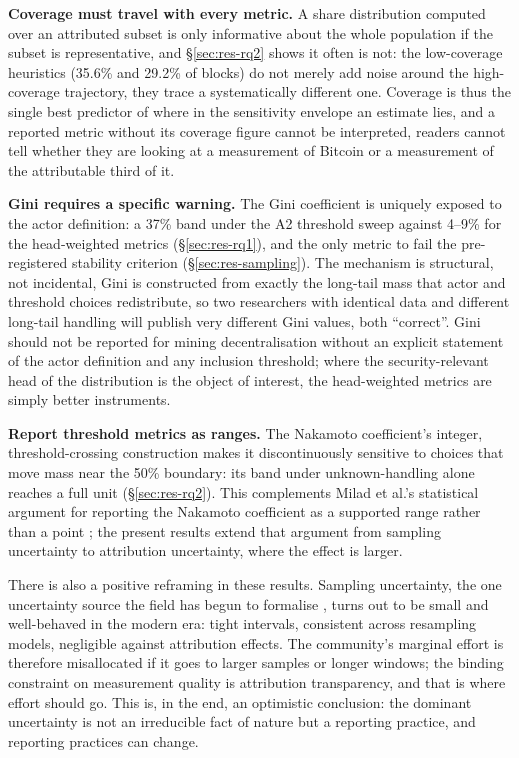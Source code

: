 \documentclass[logo,msc]{infthesis}           %
\begin{document}
\textbf{Coverage must travel with every metric.} A share distribution computed
over an attributed subset is only informative about the whole population if
the subset is representative, and \S\ref{sec:res-rq2} shows it often is not:
the low-coverage heuristics (35.6\% and 29.2\% of blocks) do not merely add
noise around the high-coverage trajectory, they trace a systematically
different one. Coverage is thus the single best predictor of where in the
sensitivity envelope an estimate lies, and a reported metric without its
coverage figure cannot be interpreted, readers cannot tell whether they are
looking at a measurement of Bitcoin or a measurement of the attributable
third of it.

\textbf{Gini requires a specific warning.} The Gini coefficient is uniquely
exposed to the actor definition: a 37\% band under the A2 threshold sweep
against 4--9\% for the head-weighted metrics (\S\ref{sec:res-rq1}), and the
only metric to fail the pre-registered stability criterion
(\S\ref{sec:res-sampling}). The mechanism is structural, not incidental,
Gini is constructed from exactly the long-tail mass that actor and threshold
choices redistribute, so two researchers with identical data and different
long-tail handling will publish very different Gini values, both ``correct''.
Gini should not be reported for mining decentralisation without an explicit
statement of the actor definition and any inclusion threshold; where the
security-relevant head of the distribution is the object of interest, the
head-weighted metrics are simply better instruments.

\textbf{Report threshold metrics as ranges.} The Nakamoto coefficient's
integer, threshold-crossing construction makes it discontinuously sensitive to
choices that move mass near the 50\% boundary: its band under unknown-handling
alone reaches a full unit (\S\ref{sec:res-rq2}). This complements Milad et
al.'s statistical argument for reporting the Nakamoto coefficient as a
supported range rather than a point \cite{milad2024statistical}; the present
results extend that argument from sampling uncertainty to attribution
uncertainty, where the effect is larger.

There is also a positive reframing in these results. Sampling uncertainty,
the one uncertainty source the field has begun to formalise
\cite{milad2024statistical}, turns out to be small and well-behaved in the
modern era: tight intervals, consistent across resampling models, negligible
against attribution effects. The community's marginal effort is therefore
misallocated if it goes to larger samples or longer windows; the binding
constraint on measurement quality is attribution transparency, and that is
where effort should go. This is, in the end, an optimistic conclusion:
the dominant uncertainty is not an irreducible fact of nature but a reporting
practice, and reporting practices can change.
\end{document}
